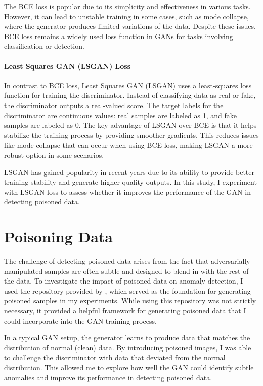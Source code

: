 \documentclass[14]{article}
\begin{document}
The BCE loss is popular due to its simplicity and effectiveness in various tasks. However, it can lead to unstable training in some cases, such as mode collapse, where the generator produces limited variations of the data. Despite these issues, BCE loss remains a widely used loss function in GANs for tasks involving classification or detection.

\paragraph{Least Squares GAN (LSGAN) Loss}

In contrast to BCE loss, Least Squares GAN (LSGAN) uses a least-squares loss function for training the discriminator. Instead of classifying data as real or fake, the discriminator outputs a real-valued score. The target labels for the discriminator are continuous values: real samples are labeled as 1, and fake samples are labeled as 0. The key advantage of LSGAN over BCE is that it helps stabilize the training process by providing smoother gradients. This reduces issues like mode collapse that can occur when using BCE loss, making LSGAN a more robust option in some scenarios.

LSGAN has gained popularity in recent years due to its ability to provide better training stability and generate higher-quality outputs. In this study, I experiment with LSGAN loss to assess whether it improves the performance of the GAN in detecting poisoned data.

\section{Poisoning Data}

The challenge of detecting poisoned data arises from the fact that adversarially manipulated samples are often subtle and designed to blend in with the rest of the data. To investigate the impact of poisoned data on anomaly detection, I used the repository provided by \citet{geiping2024datapoisoning}, which served as the foundation for generating poisoned samples in my experiments. While using this repository was not strictly necessary, it provided a helpful framework for generating poisoned data that I could incorporate into the GAN training process.

In a typical GAN setup, the generator learns to produce data that matches the distribution of normal (clean) data. By introducing poisoned images, I was able to challenge the discriminator with data that deviated from the normal distribution. This allowed me to explore how well the GAN could identify subtle anomalies and improve its performance in detecting poisoned data.
\end{document}
